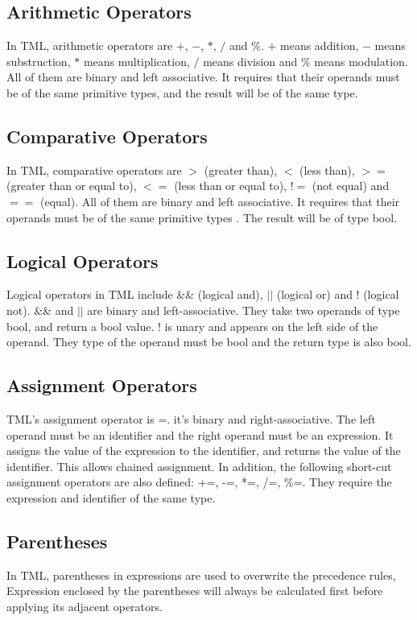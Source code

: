 \documentclass[12pt,psfig,a4]{article}
\begin{document}
\subsection{Arithmetic Operators}
In TML, arithmetic operators are $+$, $-$, $*$, $/$ and $\%$. $+$ means addition, $-$ means substruction, $*$ means multiplication, $/$ means division and $\%$ means modulation. All of them are binary and left associative. It requires that their operands must be of the same primitive types, and the result will be of the same type.

\subsection{Comparative Operators}
In TML, comparative operators are $>$ (greater than), $<$ (less than), $>=$ (greater than or equal to), $<=$ (less than or equal to), $!=$ (not equal) and $==$ (equal). All of them are binary and left associative. It requires that their operands must be of the same primitive types . The result will be of type bool.

\subsection{Logical Operators}
Logical operators in TML include \&\& (logical and), $||$ (logical or) and ! (logical not). \&\& and $||$ are binary and left-associative. They take two operands of type bool, and return a bool value. ! is unary and appears on the left side of the operand. They type of the operand must be bool and the return type is also bool.

\subsection{Assignment Operators}
TML's assignment operator is =. it's binary and right-associative. The left operand must be an identifier and the right operand must be an expression. It assigns the value of the expression to the identifier, and returns the value of the identifier. This allows chained assignment. In addition, the following short-cut assignment operators are also defined: +=, -=, *=, /=, \%=. They require the expression and identifier of the same type.

\subsection{Parentheses}
In TML, parentheses in expressions are used to overwrite the precedence rules, Expression enclosed by the parentheses will always be calculated first before applying its adjacent operators.
\end{document}
